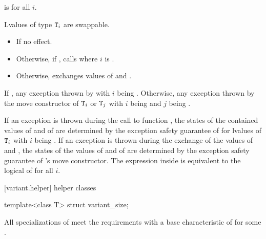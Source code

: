 \begin{itemdescr}
\pnum
\mandates
{} is  for all $i$.

\pnum
\expects
Lvalues of type $\texttt{T}_i$ are swappable.

\pnum
\effects
\begin{itemize}
\item
If  no effect.
\item
Otherwise, if , calls  where $i$ is .
\item
Otherwise, exchanges values of  and .
\end{itemize}

\pnum
\throws
If ,
any exception thrown by 
with $i$ being .
Otherwise, any exception thrown by the move constructor
of $\texttt{T}_i$ or $\texttt{T}_j$
with $i$ being  and $j$ being .

\pnum
\remarks
If an exception is thrown during the call to function ,
the states of the contained values of  and of  are
determined by the exception safety guarantee of  for lvalues of
$\texttt{T}_i$ with $i$ being .
If an exception is thrown during the exchange of the values of 
and , the states of the values of  and of 
are determined by the exception safety guarantee of 's move constructor.
The expression inside  is equivalent to the logical  of
 for all $i$.
\end{itemdescr}

[variant.helper]{ helper classes}

%
\begin{itemdecl}
template<class T> struct variant_size;
\end{itemdecl}

\begin{itemdescr}
\pnum
All specializations of  meet the
 requirements
with a base characteristic of  for some .
\end{itemdescr}

